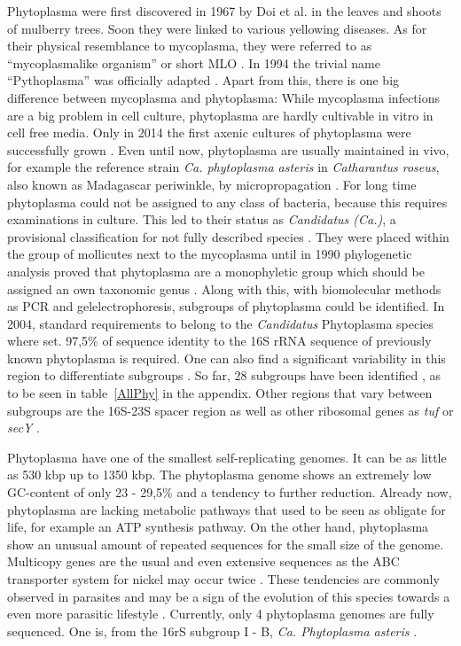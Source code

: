 \documentclass[a4paper]{article}
\begin{document}
Phytoplasma were first discovered in 1967 by Doi et al. in the leaves and shoots of mulberry trees.
Soon they were linked to various yellowing diseases. 
As for their physical resemblance to mycoplasma, they were referred to as ``mycoplasmalike organism'' or short MLO \cite{p14}.
In 1994 the trivial name ``Pythoplasma'' was officially adapted \cite{p30}.
Apart from this, there is one big difference between mycoplasma and phytoplasma: While mycoplasma infections are a big problem in cell culture, phytoplasma are hardly cultivable in vitro in cell free media. Only in 2014 the first axenic cultures of phytoplasma were successfully grown \cite{p25}.
Even until now, phytoplasma are usually maintained in vivo, for example the reference strain \textit{Ca.  phytoplasma asteris}  in \textit{Catharantus roseus}, also known as Madagascar periwinkle, by micropropagation \cite{p13}.
For long time phytoplasma could not be assigned to any class of bacteria, because this requires examinations in culture. 
This led to their status as \textit{Candidatus (Ca.)}, a provisional classification for not fully described species \cite{p30}.
They were placed within the group of mollicutes next to the mycoplasma until in 1990 phylogenetic analysis proved that phytoplasma are a monophyletic group which should be assigned an own taxonomic genus \cite{p13}.
Along with this, with biomolecular methods as PCR and gelelectrophoresis, subgroups of phytoplasma could be identified. In 2004, standard requirements to belong to the \textit{Candidatus} Phytoplasma species where set. 
97,5\% of sequence identity to the 16S rRNA sequence of previously known phytoplasma is required. One can also find a significant variability in this region to differentiate subgroups \cite{p24}.
So far, 28 subgroups have been identified \cite{p13}, as to be seen in table~\ref{AllPhy} in the appendix.
Other regions that vary between subgroups are the 16S-23S spacer region as well as other ribosomal genes as \textit{tuf} or \textit{secY} \cite{p24}.

Phytoplasma have one of the smallest self-replicating genomes. It can be as little as 530 kbp up to 1350 kbp. The phytoplasma genome shows an extremely low GC-content of only 23 - 29,5\% and a tendency to further reduction. 
Already now, phytoplasma are lacking metabolic pathways that used to be seen as obligate for life, for example an ATP synthesis pathway. On the other hand, phytoplasma show an unusual amount of repeated sequences for the small size of the genome. Multicopy genes are the usual and even extensive sequences as the ABC transporter system for nickel may occur twice \cite{p13}.
These tendencies are commonly observed in parasites and may be a sign of the evolution of this species towards a even more parasitic lifestyle \cite{p24}. 
Currently, only 4 phytoplasma genomes are fully sequenced. One is, from the 16rS subgroup I - B, \textit{Ca. Phytoplasma asteris} \cite{p24}.
\end{document}
